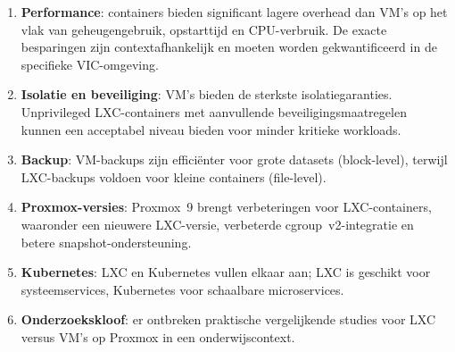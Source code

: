 \begin{enumerate}
    \item \textbf{Performance}: containers bieden significant lagere overhead dan VM's op het vlak van geheugengebruik, opstarttijd en CPU-verbruik. De exacte besparingen zijn contextafhankelijk en moeten worden gekwantificeerd in de specifieke VIC-omgeving.
    \item \textbf{Isolatie en beveiliging}: VM's bieden de sterkste isolatiegaranties. Unprivileged LXC-containers met aanvullende beveiligingsmaatregelen kunnen een acceptabel niveau bieden voor minder kritieke workloads.
    \item \textbf{Backup}: VM-backups zijn efficiënter voor grote datasets (block-level), terwijl LXC-backups voldoen voor kleine containers (file-level).
    \item \textbf{Proxmox-versies}: Proxmox~9 brengt verbeteringen voor LXC-containers, waaronder een nieuwere LXC-versie, verbeterde cgroup~v2-integratie en betere snapshot-ondersteuning.
    \item \textbf{Kubernetes}: LXC en Kubernetes vullen elkaar aan; LXC is geschikt voor systeemservices, Kubernetes voor schaalbare microservices.
    \item \textbf{Onderzoekskloof}: er ontbreken praktische vergelijkende studies voor LXC versus VM's op Proxmox in een onderwijscontext.
\end{enumerate}

